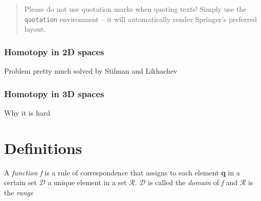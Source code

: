 \documentclass[graybox]{svmult}
\begin{document}
\begin{quotation}
Please do not use quotation marks when quoting texts! Simply use the \verb|quotation| environment -- it will automatically render Springer's preferred layout.
\end{quotation}

\subsubsection{Homotopy in 2D spaces}
Problem pretty much solved by Stilman and Likhachev

\subsubsection{Homotopy in 3D spaces}
Why it is hard

\section{Definitions}
\label{sec:Definitions}

\begin{definition}
A \textit{function f} is a rule of correspondence that assigns to each element \textbf{q} in a certain set $\mathcal{D}$ a unique element in a set $\mathcal{R}$. $\mathcal{D}$ is called the \textit{domain} of \textit{f} and $\mathcal{R}$ is the \textit{range}
\end{definition}

\begin{definition}

\end{definition}


\end{document}
